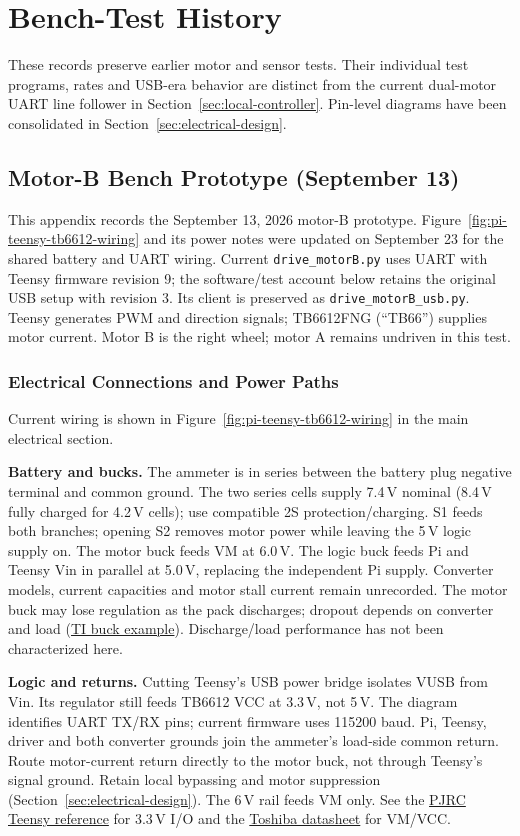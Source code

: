 \clearpage
\section{Bench-Test History}
\label{app:bench-history}
These records preserve earlier motor and sensor tests. Their individual test programs, rates and USB-era behavior are distinct from the current dual-motor UART line follower in Section~\ref{sec:local-controller}. Pin-level diagrams have been consolidated in Section~\ref{sec:electrical-design}.
\subsection{Motor-B Bench Prototype (September 13)}
\label{app:pi-teensy-motor}

This appendix records the September 13, 2026 motor-B prototype. Figure~\ref{fig:pi-teensy-tb6612-wiring} and its power notes were updated on September 23 for the shared battery and UART wiring. Current \texttt{drive\_motorB.py} uses UART with Teensy firmware revision 9; the software/test account below retains the original USB setup with revision 3. Its client is preserved as \texttt{drive\_motorB\_usb.py}. Teensy generates PWM and direction signals; TB6612FNG (``TB66'') supplies motor current. Motor B is the right wheel; motor A remains undriven in this test.

\subsubsection{Electrical Connections and Power Paths}
Current wiring is shown in Figure~\ref{fig:pi-teensy-tb6612-wiring} in the main electrical section.

\noindent\textbf{Battery and bucks.} The ammeter is in series between the battery plug negative terminal and common ground. The two series cells supply 7.4\,V nominal (8.4\,V fully charged for 4.2\,V cells); use compatible 2S protection/charging. S1 feeds both branches; opening S2 removes motor power while leaving the 5\,V logic supply on. The motor buck feeds VM at 6.0\,V. The logic buck feeds Pi and Teensy Vin in parallel at 5.0\,V, replacing the independent Pi supply. Converter models, current capacities and motor stall current remain unrecorded. The motor buck may lose regulation as the pack discharges; dropout depends on converter and load (\href{https://www.ti.com/product/LM5166}{TI buck example}). Discharge/load performance has not been characterized here.

\noindent\textbf{Logic and returns.} Cutting Teensy's USB power bridge isolates VUSB from Vin. Its regulator still feeds TB6612 VCC at 3.3\,V, not 5\,V. The diagram identifies UART TX/RX pins; current firmware uses 115200 baud. Pi, Teensy, driver and both converter grounds join the ammeter's load-side common return. Route motor-current return directly to the motor buck, not through Teensy's signal ground. Retain local bypassing and motor suppression (Section~\ref{sec:electrical-design}). The 6\,V rail feeds VM only. See the \href{https://www.pjrc.com/store/teensy41.html}{PJRC Teensy reference} for 3.3\,V I/O and the \href{https://toshiba.semicon-storage.com/info/datasheet_en_20141001.pdf?did=10660}{Toshiba datasheet} for VM/VCC.

